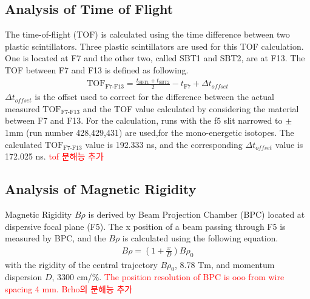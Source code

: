 \subsection{Analysis of Time of Flight}
The time-of-flight (TOF) is calculated using the time difference between two plastic scintillators. Three plastic scintillators are used for this TOF calculation. One is located at F7 and the other two, called SBT1 and SBT2, are at F13. The TOF between F7 and F13 is defined as following.
    \begin{align}
        \text{TOF}_{\text{F7-F13}} = \frac{t_{\text{SBT1}} + t_{\text{SBT2}}}{2} - t_{\text{F7}} + \Delta t_{offset}
    \end{align}
$\Delta t_{offset}$ is the offset used to correct for the difference between the actual measured $\text{TOF}_{\text{F7-F13}}$ and the TOF value calculated by considering the material between F7 and F13. For the calculation, runs with the f5 slit narrowed to $\pm$ 1mm (run number 428,429,431) are used,for the mono-energetic isotopes. The calculated $\text{TOF}_{\text{F7-F13}}$ value is 192.333 ns, and the corresponding $\Delta t_{offset}$ value is 172.025 ns. \textcolor{red}{tof 분해능 추가}

\subsection{Analysis of Magnetic Rigidity}
Magnetic Rigidity $B\rho$ is derived by Beam Projection Chamber (BPC) located at dispersive focal plane (F5). The x position of a beam passing through F5 is measured by BPC, and the $B\rho$ is calculated using the following equation.
    \begin{align}
        B\rho = (1+\frac{x}{D}) B\rho_{0} 
    \end{align}
with the rigidity of the central trajectory $B\rho_{0}$, 8.78 Tm, and  momentum dispersion $D$, 3300 cm/$\%$. \textcolor{red}{The position resolution of BPC is ooo from wire spacing 4 mm.} \textcolor{red}{Brho의 분해능 추가}

